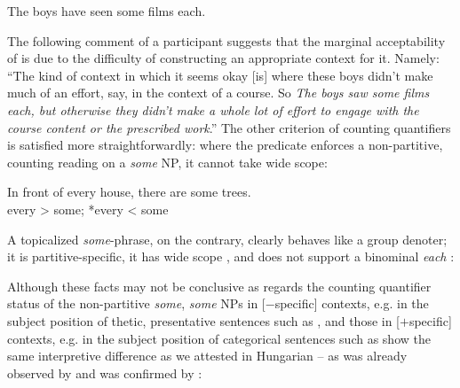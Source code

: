 \documentclass[output=paper]{langscibook}
\begin{document}
\ea The boys have seen some films each. \label{kis-zet:film}
\z

\noindent The following comment of a participant suggests that the marginal acceptability of  is due to the difficulty of constructing an appropriate context for it. Namely: ``The kind of context in which it seems okay [is] where these boys didn't make much of an effort, say, in the context of a course. So \textit{The boys saw some films each, but otherwise they didn't make a whole lot of effort to engage with the course content or the prescribed work}.'' 
The other criterion of counting quantifiers is satisfied more straightforwardly: where the predicate enforces a non-partitive, counting reading on a \textit{some} NP, it cannot take wide scope:

\ea In front of every house, there are some trees.\\
every > some; *every < some
\z

\noindent A topicalized \textit{some}-phrase, on the contrary, clearly behaves like a group denoter; it is partitive-specific, it has wide scope , and does not support a binominal \textit{each} :

\eal
{}\label{kis-zet:blossom}
\label{kis-zet:some films}
\zl

\noindent Although these facts may not be conclusive as regards the counting quantifier status of the non-partitive \textit{some}, \textit{some} NPs in [$-$specific] contexts, e.g. in the subject position of thetic, presentative sentences such as , and those in [$+$specific] contexts, e.g. in the subject position of categorical sentences such as  show the same interpretive difference as we attested in Hungarian – as was already observed by \citet{diesing1992indefinites} and was confirmed by \citet{vonfintel1998evidence}:

\ea\label{kis-zet:some major mistakes}
\z
\ex\label{kis-zet:some mistakes}
\z
\z

\end{document}
